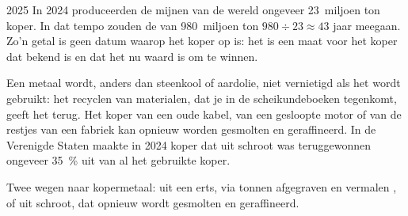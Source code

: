 \begin{dated}{2025}
In 2024 produceerden de mijnen van de wereld ongeveer 23~miljoen ton
koper. In dat tempo zouden de  van 980~miljoen ton $980 \div 23
\approx 43$ jaar meegaan. Zo'n getal is geen datum waarop het koper op is:
het is een maat voor het koper dat bekend is en dat het nu waard is om te
winnen.
\end{dated}

Een metaal wordt, anders dan steenkool of aardolie, niet vernietigd als het
wordt gebruikt: het recyclen van materialen, dat je in de scheikundeboeken
tegenkomt, geeft het terug. Het koper van een oude kabel, van een
gesloopte motor of van de restjes van een fabriek kan opnieuw worden
gesmolten en geraffineerd. In de Verenigde Staten maakte in 2024 koper dat
uit schroot was teruggewonnen ongeveer \qty{35}{\%} uit van al het
gebruikte koper.

\begin{omfigure}

{\small Twee wegen naar kopermetaal: uit een erts, via tonnen afgegraven
en vermalen , of uit schroot, dat opnieuw wordt gesmolten en
geraffineerd.}
\end{omfigure}

